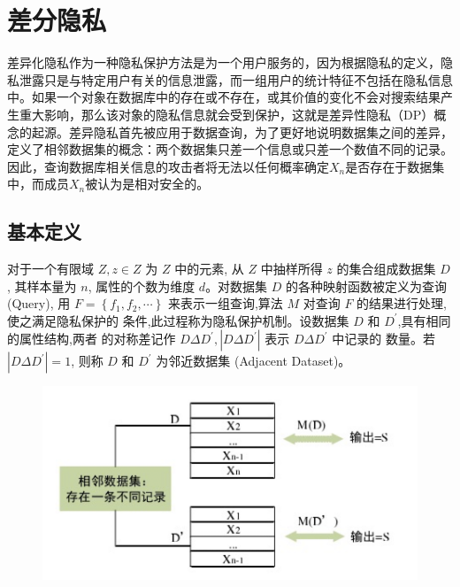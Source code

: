 \section{差分隐私}
差异化隐私作为一种隐私保护方法是为一个用户服务的，因为根据隐私的定义，隐私泄露只是与特定用户有关的信息泄露，而一组用户的统计特征不包括在隐私信息中。如果一个对象在数据库中的存在或不存在，或其价值的变化不会对搜索结果产生重大影响，那么该对象的隐私信息就会受到保护，这就是差异性隐私（DP）概念的起源。差异隐私首先被应用于数据查询，为了更好地说明数据集之间的差异，定义了相邻数据集的概念：两个数据集只差一个信息或只差一个数值不同的记录。因此，查询数据库相关信息的攻击者将无法以任何概率确定$X_{n}$是否存在于数据集中，而成员$X_{n}$被认为是相对安全的。


\subsection{基本定义}
对于一个有限域 $Z, z \in Z$ 为 $Z$ 中的元素, 从 $Z$ 中抽样所得 $z$ 的集合组成数据集 $D$, 其样本量为 $n$, 属性的个数为维度 $d$。对数据集 $D$ 的各种映射函数被定义为查询 (Query), 用 $F=\left\{f_{1}, f_{2}, \cdots\right\}$ 来表示一组查询,算法 $M$ 对查询 $F$ 的结果进行处理,使之满足隐私保护的 条件,此过程称为隐私保护机制。设数据集 $D$ 和 $D^{\prime}$,具有相同的属性结构,两者 的对称差记作 $D \Delta D^{\prime},\left|D \Delta D^{\prime}\right|$ 表示 $D \Delta D^{\prime}$ 中记录的 数量。若 $\left|D \Delta D^{\prime}\right|=1$, 则称 $D$ 和 $D^{\prime}$ 为邻近数据集 (Adjacent Dataset)。
\begin{figure}[!hbt]
\centering
	\includegraphics[scale=0.7]{fig2/C2/相邻数据集示意图}%
	\label{fig:相邻数据集示意图}	
\end{figure}


